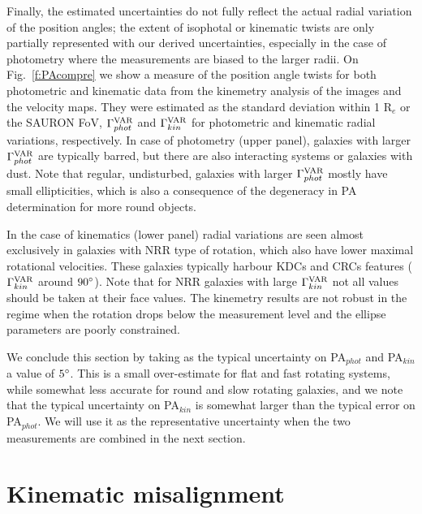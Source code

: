 \documentclass[usenatbib,usegraphicx]{mn2e}
\begin{document}
Finally, the estimated uncertainties do not fully reflect the actual radial variation of the position angles; the extent of isophotal or kinematic twists are only partially represented with our derived uncertainties, especially in the case of photometry where the measurements are biased to the larger radii. On Fig.~\ref{f:PAcompre} we show a measure of the position angle twists for both photometric and kinematic data from the kinemetry analysis of the images and the velocity maps. They were estimated as the standard deviation within 1 R$_e$ or the SAURON FoV, $\Gamma^{\rm VAR}_{phot}$ and $\Gamma^{\rm VAR}_{kin}$ for photometric and kinematic radial variations, respectively. In case of photometry (upper panel), galaxies with larger $\Gamma^{\rm VAR}_{phot}$ are typically barred, but there are also interacting systems or galaxies with dust. Note that regular, undisturbed, galaxies with larger $\Gamma^{\rm VAR}_{phot}$ mostly have small ellipticities, which is also a consequence of the degeneracy in PA determination for more round objects. 

In the case of kinematics (lower panel) radial variations are seen almost exclusively in galaxies with NRR type of rotation, which also have lower maximal rotational velocities. These galaxies typically harbour KDCs and CRCs features ($\Gamma^{\rm VAR}_{kin}$ around $90\hbox{$^\circ$}$). Note that for NRR galaxies with large  $\Gamma^{\rm VAR}_{kin}$ not all values should be taken at their face values. The kinemetry results are not robust in the regime when the rotation drops below the measurement level and the ellipse parameters are poorly constrained. 

We conclude this section by taking as the typical uncertainty on PA$_{phot}$ and PA$_{kin}$ a value of $5\hbox{$^\circ$}$. This is a small over-estimate for flat and fast rotating systems, while somewhat less accurate for round and slow rotating galaxies, and we note that the typical uncertainty on PA$_{kin}$ is somewhat larger than the typical error on PA$_{phot}$. We will use it as the representative uncertainty when the two measurements are combined in the next section. 


%
%


\section{Kinematic misalignment}
\label{s:kinmis}
\end{document}
